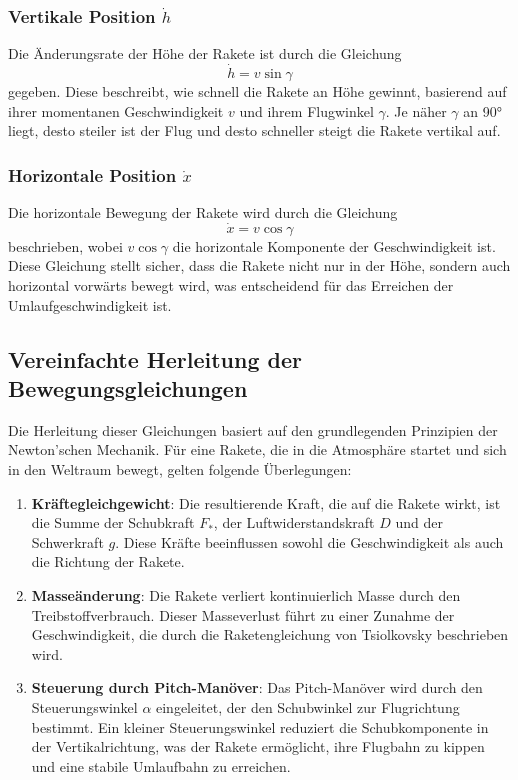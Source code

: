 \subsubsection{Vertikale Position \(\dot{h}\)}
Die Änderungsrate der Höhe der Rakete ist durch die Gleichung
\[
\dot{h} = v \sin \gamma
\]
gegeben. 
Diese beschreibt, wie schnell die Rakete an Höhe gewinnt, basierend auf ihrer momentanen Geschwindigkeit \(v\) und ihrem Flugwinkel \(\gamma\). 
Je näher \(\gamma\) an 90° liegt, desto steiler ist der Flug und desto schneller steigt die Rakete vertikal auf.

\subsubsection{Horizontale Position \(\dot{x}\)}
Die horizontale Bewegung der Rakete wird durch die Gleichung
\[
\dot{x} = v \cos \gamma
\]
beschrieben, wobei \(v \cos \gamma\) die horizontale Komponente der Geschwindigkeit ist. 
Diese Gleichung stellt sicher, dass die Rakete nicht nur in der Höhe, sondern auch horizontal vorwärts bewegt wird, was entscheidend für das Erreichen der Umlaufgeschwindigkeit ist.

\subsection{Vereinfachte Herleitung der Bewegungsgleichungen}
Die Herleitung dieser Gleichungen basiert auf den grundlegenden Prinzipien der Newton'schen Mechanik. Für eine Rakete, die in die Atmosphäre startet und sich in den Weltraum bewegt, gelten folgende Überlegungen:

\begin{enumerate}
	\item \textbf{Kräftegleichgewicht}: Die resultierende Kraft, die auf die Rakete wirkt, ist die Summe der Schubkraft \(F_*\), der Luftwiderstandskraft \(D\) und der Schwerkraft \(g\). 
	Diese Kräfte beeinflussen sowohl die Geschwindigkeit als auch die Richtung der Rakete.
	
	\item \textbf{Masseänderung}: Die Rakete verliert kontinuierlich Masse durch den Treibstoffverbrauch. 
	Dieser Masseverlust führt zu einer Zunahme der Geschwindigkeit, die durch die Raketengleichung von Tsiolkovsky beschrieben wird.
	
	\item \textbf{Steuerung durch Pitch-Manöver}: Das Pitch-Manöver wird durch den Steuerungswinkel \(\alpha\) eingeleitet, der den Schubwinkel zur Flugrichtung bestimmt. 
	Ein kleiner Steuerungswinkel reduziert die Schubkomponente in der Vertikalrichtung, was der Rakete ermöglicht, ihre Flugbahn zu kippen und eine stabile Umlaufbahn zu erreichen.
\end{enumerate}

